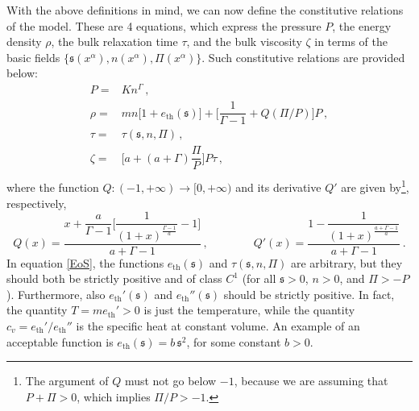 \documentclass[a4paper, amsfonts, amssymb, amsmath, reprint, showkeys, nofootinbib, twoside,notitlepage,onecolumn]{revtex4-2}
\newcommand{\spc}{\quad \quad \quad}
\newcommand{\s}{{\mathfrak{s}}}
\theoremstyle{definition}
\theoremstyle{theorem}
\theoremstyle{corollary}
\begin{document}
With the above definitions in mind, we can now define the constitutive relations of the model. These are 4 equations, which express the pressure $P$, the energy density $\rho$, the bulk relaxation time $\tau$, and the bulk viscosity $\zeta$ in terms of the basic fields $\{\s(x^\alpha),n(x^\alpha),\Pi(x^\alpha) \}$. Such constitutive relations are provided below:
\begin{equation}\label{EoS}
\begin{split}
P={}& Kn^\Gamma \, , \\
\rho= {}& mn\big[1+e_\text{th}(\s) \big]+  \bigg[\dfrac{1}{\Gamma{-}1} + Q(\Pi/P) \bigg]P \, , \\
\tau={}& \tau(\s,n,\Pi) \, , \\
\zeta = {}&  \bigg[a+(a+\Gamma) \dfrac{\Pi}{P} \bigg] P\tau \, , \\
\end{split}
\end{equation}
where the function $Q: (-1,+\infty)\rightarrow [0,+\infty)$ and its derivative $Q'$ are given by\footnote{The argument of $Q$ must not go below $-1$, because we are assuming that $P{+}\Pi>0$, which implies $\Pi/P>-1$.}, respectively,
\begin{equation}\label{thefunctionQ}
Q(x)=\dfrac{x+\dfrac{a}{\Gamma{-}1}\bigg[ \dfrac{1}{(1{+}x)^{\frac{\Gamma-1}{a}}}-1 \bigg]}{a{+}\Gamma{-}1}\, , \quad \spc
Q'(x)=\dfrac{1-\dfrac{1}{{(1{+}x)^{\frac{a+\Gamma-1}{a}}}}}{a{+}\Gamma{-}1}\, .
\end{equation}
In equation \eqref{EoS}, the functions $e_\text{th}(\s)$ and $\tau(\s,n,\Pi)$ are arbitrary, but they should both be strictly positive and of class $C^1$ (for all $\s{>}0$, $n{>}0$, and $\Pi{>}{-}P$). Furthermore, also $e_\text{th}'(\s)$ and $e_\text{th}''(\s)$ should be strictly positive. In fact, the quantity $T=me_\text{th}'>0$ is just the temperature, while the quantity $c_v=e_\text{th}'/e_\text{th}''$ is the specific heat at constant volume. An example of an acceptable function is $e_\text{th}(\s)=b\, \s^2$, for some constant $b>0$.
\end{document}
